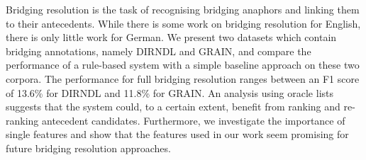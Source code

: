 Bridging resolution is the task of recognising bridging anaphors and linking them to their antecedents. While there is some work on bridging resolution for English, there is only little work for German. We present two datasets which contain bridging annotations, namely DIRNDL and GRAIN, and compare the performance of a rule-based system with a simple baseline approach on these two corpora. The performance for full bridging resolution ranges between an F1 score of 13.6\% for DIRNDL and 11.8\% for GRAIN. An analysis using oracle lists suggests that the system could, to a certain extent, benefit from ranking and re-ranking antecedent candidates. Furthermore, we investigate the importance of single features and show that the features used in our work seem promising for future bridging resolution approaches.
